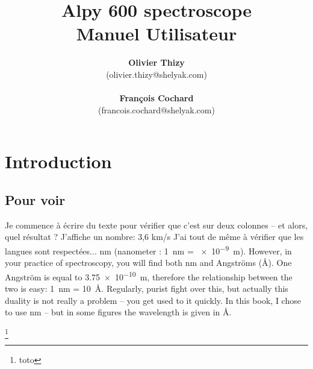 \documentclass[10pt,a4paper]{shelyak}
\begin{document}
\title{\textbf{Alpy 600 spectroscope}\\
\textbf{Manuel Utilisateur }}


\author{\textbf{Olivier Thizy}\\
(olivier.thizy@shelyak.com)\\
\\
\textbf{François Cochard}\\
(francois.cochard@shelyak.com)}


\maketitle



\chapter{Introduction}
\section{Pour voir}
Je commence à écrire du texte pour vérifier que c'est sur deux colonnes -- et alors, quel résultat ?
J'affiche un nombre: 3,6 km/s
J'ai tout de même à vérifier que les langues sont respectées...
\si{\nm} (nanometer : \SI{1}{\nm} =
    \SI{e-9}{\metre}). However, in your practice of spectroscopy, you
    will find both \si{\nm} and Angstr\"oms (\si{\angstrom}). One Angstr\"om
    is equal to \SI{3,75 e-10}{\m}, therefore the relationship between the
    two is easy:  \SI{1}{\nm} = \SI{10}{\angstrom}. Regularly, purist
    fight over this, but actually this duality is not really a problem
    -- you get used to it quickly. In this book, I chose to use
    \si{\nm} -- but in some figures the wavelength is given in \si{\angstrom}.
    
    \footnote{toto}
\end{document}

